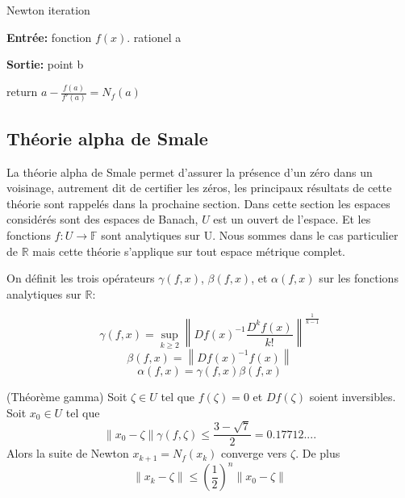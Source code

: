 \documentclass[a4paper,10.5pt]{article}
\begin{document}
	\begin{algorithm}
		\caption{Newton iteration}
		
		\vspace{2mm}
		
		\textbf{Entrée:} fonction $f(x)$. rationel a
		
		\textbf{Sortie:} point b
		
		\begin{algorithmic}[1]
			
			\STATE return $a-\frac{f(a)}{f'(a)}=N_{f}(a)$
		\end{algorithmic}
	\end{algorithm}

	\subsection{Théorie alpha de Smale}
	La théorie alpha de Smale permet d'assurer la présence d'un zéro dans un voisinage, autrement dit de certifier les zéros, les principaux résultats de cette théorie sont rappelés dans la prochaine section.
	Dans cette section les espaces considérés sont des espaces de Banach, $U$ est un ouvert de l'espace. Et les fonctions $f:U\rightarrow \mathbb{F}$ sont analytiques sur U. Nous sommes dans le cas particulier de $\mathbb{R}$ mais cette théorie s'applique sur tout espace métrique complet. 
	
	\begin{definition}
		
		On définit les trois opérateurs $\gamma(f,x)$, $\beta(f,x)$, et $\alpha(f,x)$ sur les fonctions analytiques sur $\mathbb{R}$:
		
		\[\gamma(f,x)=\sup_{k \geq 2}\left\|Df(x)^{-1}\frac{D^{k}f(x)}{k!}\right\|^{\frac{1}{k-1}}\]
		\[\beta(f,x)=\left\|Df(x)^{-1}f(x)\right\|\]
		\[\alpha(f,x)=\gamma(f,x)\beta(f,x)\]
	\end{definition}
	
	\begin{theorem}(Théorème gamma) Soit $\zeta \in U$ tel que $f(\zeta)=0$ et $Df(\zeta)$ soient inversibles. Soit $x_{0} \in U$ tel que \\
		\[\left\|x_{0}-\zeta\right\|\gamma(f,\zeta) \leq \frac{3-\sqrt{7}}{2}=0.17712.... \]
		Alors la suite de Newton $x_{k+1}=N_{f}(x_{k})$ converge vers $\zeta$. De plus\\
		\[\left\|x_{k}-\zeta\right\| \leq \left(\frac{1}{2}\right)^{n}\left\|x_{0}-\zeta\right\|\]
	\end{theorem}
	
\end{document}
